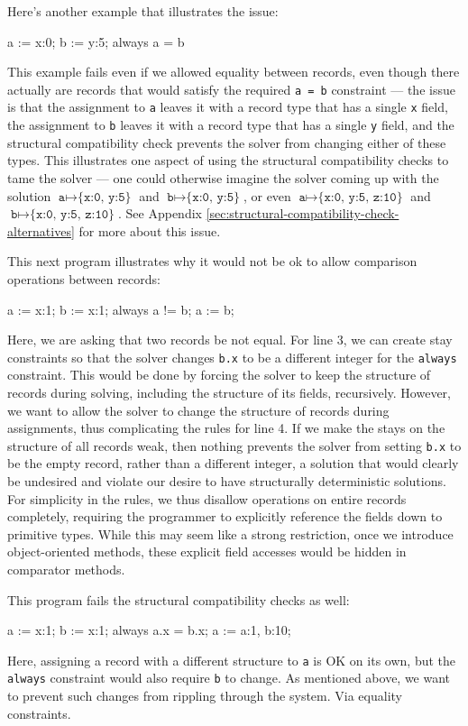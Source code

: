 \documentclass{article}
\begin{document}
Here's another example that illustrates the issue:
\begin{example}
a := {x:0};
b := {y:5};
always a = b
\end{example}
This example fails even if we allowed equality between records, even
though there actually are records that would satisfy the required
\verb!a = b! constraint --- the issue is that the assignment to
\verb|a| leaves it with a record type that has a single \verb|x|
field, the assignment to \verb|b| leaves it with a record type that
has a single \verb|y| field, and the structural compatibility check
prevents the solver from changing either of these types.  This
illustrates one aspect of using the structural compatibility checks to
tame the solver --- one could otherwise imagine the solver coming up
with the solution $\texttt{a} \mapsto \texttt{\{x:0, y:5\}}$ and
$\texttt{b} \mapsto \texttt{\{x:0, y:5\}}$, or even
$\texttt{a} \mapsto \texttt{\{x:0, y:5, z:10\}}$ and
$\texttt{b} \mapsto \texttt{\{x:0, y:5, z:10\}}$.  See Appendix
\ref{sec:structural-compatibility-check-alternatives} for more about
this issue.

This next program illustrates why it would not be ok to allow
comparison operations between records:
\begin{example}
a := {x:1};
b := {x:1};
always a != b;
a := b;
\end{example}
Here, we are asking that two records be not equal. For line 3, we can
create stay constraints so that the solver changes \verb!b.x! to be a
different integer for the \verb!always! constraint. This would be done
by forcing the solver to keep the structure of records during solving,
including the structure of its fields, recursively. However, we want
to allow the solver to change the structure of records during
assignments, thus complicating the rules for line 4. If we make the
stays on the structure of all records weak, then nothing prevents the
solver from setting \verb!b.x! to be the empty record, rather than a
different integer, a solution that would clearly be undesired and
violate our desire to have structurally deterministic solutions. For
simplicity in the rules, we thus disallow operations on entire records
completely, requiring the programmer to explicitly reference the
fields down to primitive types. While this may seem like a strong
restriction, once we introduce object-oriented methods, these explicit
field accesses would be hidden in comparator methods.

This program fails the structural compatibility checks as well:
\begin{example}
a := {x:1};
b := {x:1};
always a.x = b.x;
a := {a:1, b:10};
\end{example}
Here, assigning a record with a different structure to \verb|a| is OK
on its own, but the \verb|always| constraint would also require
\verb|b| to change. As mentioned above, we want to prevent such
changes from rippling through the system. Via equality constraints.
\end{document}
